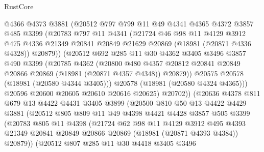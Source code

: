 \begin{lexlean}{RustCore}
\begin{coremodule}
            @4366
            @4373
            @3881
            (@20512
              @797
              @799
              @11
              @49
              @4341
              @4365
              @4372
              @3857
              @485
              @3399
              (@20783
                @797
                @11
                @4341
                (@21724
                  @46
                  @98
                  @11
                  @4129
                  @3912
                  @475
                  @4336
                  @21349
                  @20841
                  @20849
                  @21629
                  @20869
                  (@18981 (@20871 @4336 @4328))
                  @20879))
              (@20512
                @692
                @285
                @11
                @30
                @4362
                @3405
                @3496
                @3857
                @490
                @3399
                (@20785
                  @4362
                  (@20800
                    @480
                    @4357
                    @20812
                    @20841
                    @20849
                    @20866
                    @20869
                    (@18981 (@20871 @4357 @4348))
                    @20879))
                @20575
                @20578
                (@18981 (@20580 @4344 @3405)))
              @20578
              (@18981 (@20580 @4324 @4365)))
            @20596
            @20600
            @20605
            @20610
            @20616
            @20625)
          @20702))
      (@20636
        @4378
        @811
        @679
        @13
        @4422
        @4431
        @3405
        @3899
        (@20500
          @810
          @50
          @13
          @4422
          @4429
          @3881
          (@20512
            @805
            @809
            @11
            @49
            @4398
            @4421
            @4428
            @3857
            @505
            @3399
            (@20783
              @805
              @11
              @4398
              (@21724
                @62
                @98
                @11
                @4129
                @3912
                @495
                @4393
                @21349
                @20841
                @20849
                @20866
                @20869
                (@18981 (@20871 @4393 @4384))
                @20879))
            (@20512
              @807
              @285
              @11
              @30
              @4418
              @3405
              @3496

\end{coremodule}
\end{lexlean}
